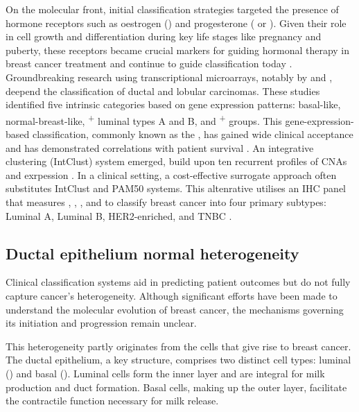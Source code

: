 On the molecular front, initial classification strategies targeted the presence of hormone receptors such as oestrogen () and progesterone ( or ). Given their role in cell growth and differentiation during key life stages like pregnancy and puberty, these receptors became crucial markers for guiding hormonal therapy in breast cancer treatment and continue to guide classification today \parencite{Early_breast_cancer_trialists_collaborative_group1992-dy}. Groundbreaking research using transcriptional microarrays, notably by \textcite{Perou2000-hc} and \textcite{Sorlie2001-yy}, deepend the classification of ductal and lobular carcinomas. These studies identified five intrinsic categories based on gene expression patterns: basal-like, normal-breast-like, \textsuperscript{+} luminal types A and B, and \textsuperscript{+} groups. This gene-expression-based classification, commonly known as the , has gained wide clinical acceptance and has demonstrated correlations with patient survival \parencite{Wallden2015-bp}. An integrative clustering (IntClust) system emerged, build upon ten recurrent profiles of \acp{CNA} and exrpession \parencite{Curtis2012-hu}. In a clinical setting, a cost-effective surrogate approach often substitutes IntClust and PAM50 systems. This altenrative utilises an \ac{IHC} panel that measures , , , and  to classify breast cancer into four primary subtypes: Luminal A, Luminal B, HER2-enriched, and \ac{TNBC} \parencite{Goldhirsch2013-xy}. 

\subsection{Ductal epithelium normal heterogeneity}
Clinical classification systems aid in predicting patient outcomes but do not fully capture cancer's heterogeneity. Although significant efforts have been made to understand the molecular evolution of breast cancer, the mechanisms governing its initiation and progression remain unclear.

This heterogeneity partly originates from the cells that give rise to breast cancer. The ductal epithelium, a key structure, comprises two distinct cell types: luminal () and basal (). Luminal cells form the inner layer and are integral for milk production and duct formation. Basal cells, making up the outer layer, facilitate the contractile function necessary for milk release.


